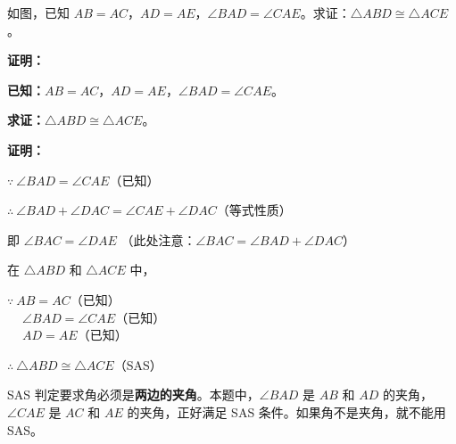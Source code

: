 \documentclass[12pt, a4paper]{ctexart}
\begin{document}
\begin{examplebox}
如图，已知 $AB = AC$，$AD = AE$，$\angle BAD = \angle CAE$。求证：$\triangle ABD \cong \triangle ACE$。

\begin{center}
\end{center}
\end{examplebox}

\textbf{证明：}

\textbf{已知：}$AB = AC$，$AD = AE$，$\angle BAD = \angle CAE$。

\textbf{求证：}$\triangle ABD \cong \triangle ACE$。

\textbf{证明：}

$\because\ \angle BAD = \angle CAE$（已知）

$\therefore\ \angle BAD + \angle DAC = \angle CAE + \angle DAC$（等式性质）

即 $\angle BAC = \angle DAE$ \quad（此处注意：$\angle BAC = \angle BAD + \angle DAC$）

在 $\triangle ABD$ 和 $\triangle ACE$ 中，

$\because\ AB = AC$（已知）\\
$\quad\ \angle BAD = \angle CAE$（已知）\\
$\quad\ AD = AE$（已知）

$\therefore\ \triangle ABD \cong \triangle ACE$（SAS）

\begin{tipbox}[方法总结]
SAS 判定要求角必须是\textbf{两边的夹角}。本题中，$\angle BAD$ 是 $AB$ 和 $AD$ 的夹角，$\angle CAE$ 是 $AC$ 和 $AE$ 的夹角，正好满足 SAS 条件。如果角不是夹角，就不能用 SAS。
\end{tipbox}
\end{document}
